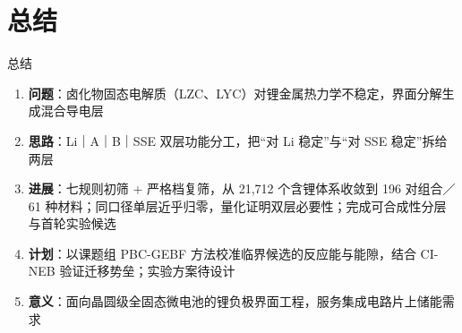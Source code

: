 \documentclass[aspectratio=169,10pt]{beamer}
\begin{document}
\section{总结}

\begin{frame}[t]{总结}
\begin{enumerate}
  \item \textbf{问题}：卤化物固态电解质（LZC、LYC）对锂金属热力学不稳定，界面分解生成混合导电层
  \item \textbf{思路}：Li｜A｜B｜SSE 双层功能分工，把“对 Li 稳定”与“对 SSE 稳定”拆给两层
  \item \textbf{进展}：七规则初筛 + 严格档复筛，从 21{,}712 个含锂体系收敛到 \alert{196 对组合／61 种材料}；同口径单层近乎归零，量化证明双层必要性；完成可合成性分层与首轮实验候选
  \item \textbf{计划}：以课题组 \alert{PBC-GEBF} 方法校准临界候选的反应能与能隙，结合 CI-NEB 验证迁移势垒；实验方案待设计
  \item \textbf{意义}：面向晶圆级全固态微电池的锂负极界面工程，服务集成电路片上储能需求
\end{enumerate}
\end{frame}
\end{document}
